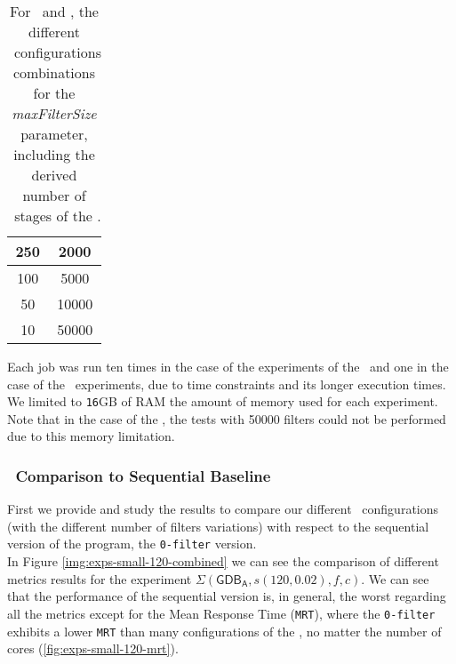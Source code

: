 \begin{table}[H]
\begin{minipage}{0.45\textwidth}
\begin{tabular}{|c|c|}
        250  &   2000    \\ \hline
        100  &   5000    \\ \hline
        50  &   10000    \\ \hline
        10  &   50000    \\ \hline
        \end{tabular}
        \caption*{\mediumG}
    \end{minipage}
    \caption{For \smallG\  and \mediumG, the different \DPATM\ configurations combinations for the \emph{maxFilterSize} parameter, including the derived number of \filter\ stages of the \DPATM.}
    \label{table:exps-filters-variations}
\end{table}

Each job was run ten times in the case of the experiments of the \smallG\ and one in the case of the \mediumG\ experiments, due to time constraints and its longer execution times. We limited to \texttt{16}GB of RAM the amount of memory used for each experiment. Note that in the case of the \mediumG, the tests with 50000 filters could not be performed due to this memory limitation.

\subsubsection*{\DPATM\ Comparison to Sequential Baseline}

First we provide and study the results to compare our different \DPATM\ configurations (with the different number of filters variations) with respect to the sequential version of the program, the \texttt{0-filter} version.\\

In Figure \ref{img:exps-small-120-combined} we can see the comparison of different metrics results for the experiment $\Sigma(\mathsf{GDB_A}, s(120, 0.02), f, c)$. We can see that the performance of the sequential version is, in general, the worst regarding all the metrics except for the Mean Response Time (\texttt{MRT}), where the \texttt{0-filter} exhibits a lower \texttt{MRT} than many configurations of the \DPATM, no matter the number of cores (\ref{fig:exps-small-120-mrt}).\\

